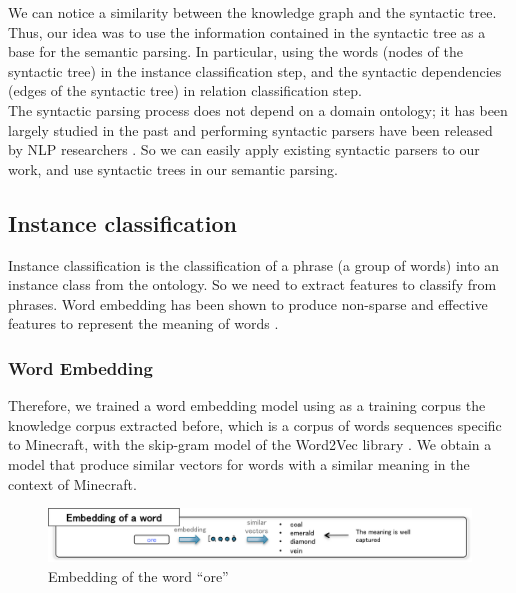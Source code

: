 \documentclass[12pt]{article}
\begin{document}
We can notice a similarity between the knowledge graph and the syntactic tree. Thus, our idea was to use the information contained in the syntactic tree as a base for the semantic parsing. In particular, using the words (nodes of the syntactic tree) in the instance classification step, and the syntactic dependencies (edges of the syntactic tree) in relation classification step.\\
The syntactic parsing process does not depend on a domain ontology; it has been largely studied in the past and performing syntactic parsers have been released by NLP researchers \cite{chen2014fast,andor2016globally}. So we can easily apply existing syntactic parsers to our work, and use syntactic trees in our semantic parsing.

\subsection{Instance classification}

Instance classification is the classification of a phrase (a group of words) into an instance class from the ontology. So we need to extract features to classify from phrases. Word embedding has been shown to produce non-sparse and effective features to represent the meaning of words \cite{mikolov2013efficient}.

\subsubsection{Word Embedding}

Therefore, we trained a word embedding model using as a training corpus the knowledge corpus extracted before, which is a corpus of words sequences specific to Minecraft, with the skip-gram model of the Word2Vec library \cite{mikolov2013distributed}. We obtain a model that produce similar vectors for words with a similar meaning in the context of Minecraft.

\begin{figure}[!ht]
   \centering \includegraphics[width=\linewidth]{Figures/Semantic_Parsing/wordEmbedding.png}
   \caption{\label{wordEmbedding} Embedding of the word ``ore''}
\end{figure}
\end{document}
